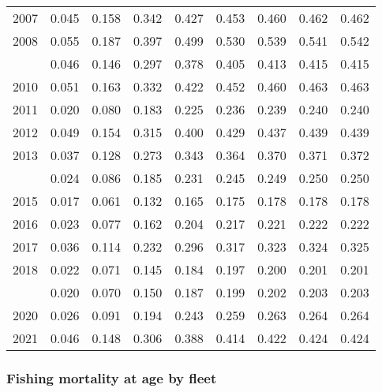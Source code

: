 \documentclass[
]{article}
\begin{document}
\begin{longtable}[t]{lrrrrrrrr}
2007 & 0.045 & 0.158 & 0.342 & 0.427 & 0.453 & 0.460 & 0.462 & 0.462\\
2008 & 0.055 & 0.187 & 0.397 & 0.499 & 0.530 & 0.539 & 0.541 & 0.542\\
\addlinespace
2009 & 0.046 & 0.146 & 0.297 & 0.378 & 0.405 & 0.413 & 0.415 & 0.415\\
2010 & 0.051 & 0.163 & 0.332 & 0.422 & 0.452 & 0.460 & 0.463 & 0.463\\
2011 & 0.020 & 0.080 & 0.183 & 0.225 & 0.236 & 0.239 & 0.240 & 0.240\\
2012 & 0.049 & 0.154 & 0.315 & 0.400 & 0.429 & 0.437 & 0.439 & 0.439\\
2013 & 0.037 & 0.128 & 0.273 & 0.343 & 0.364 & 0.370 & 0.371 & 0.372\\
\addlinespace
2014 & 0.024 & 0.086 & 0.185 & 0.231 & 0.245 & 0.249 & 0.250 & 0.250\\
2015 & 0.017 & 0.061 & 0.132 & 0.165 & 0.175 & 0.178 & 0.178 & 0.178\\
2016 & 0.023 & 0.077 & 0.162 & 0.204 & 0.217 & 0.221 & 0.222 & 0.222\\
2017 & 0.036 & 0.114 & 0.232 & 0.296 & 0.317 & 0.323 & 0.324 & 0.325\\
2018 & 0.022 & 0.071 & 0.145 & 0.184 & 0.197 & 0.200 & 0.201 & 0.201\\
\addlinespace
2019 & 0.020 & 0.070 & 0.150 & 0.187 & 0.199 & 0.202 & 0.203 & 0.203\\
2020 & 0.026 & 0.091 & 0.194 & 0.243 & 0.259 & 0.263 & 0.264 & 0.264\\
2021 & 0.046 & 0.148 & 0.306 & 0.388 & 0.414 & 0.422 & 0.424 & 0.424\\*
\end{longtable}

\hypertarget{fishing-mortality-at-age-by-fleet}{%
\subsubsection{Fishing mortality at age by
fleet}\label{fishing-mortality-at-age-by-fleet}}
\end{document}
